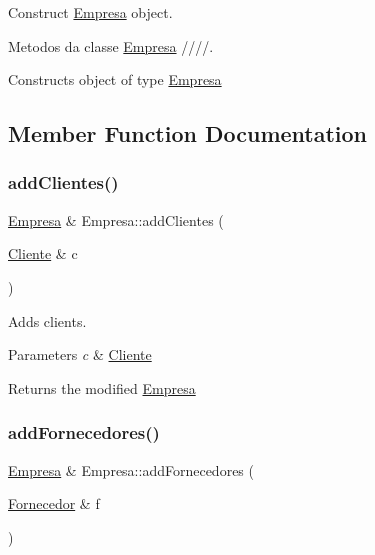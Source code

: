 Construct \hyperlink{classEmpresa}{Empresa} object. 

Metodos da classe \hyperlink{classEmpresa}{Empresa} ////.

Constructs object of type \hyperlink{classEmpresa}{Empresa} 

\subsection{Member Function Documentation}
\mbox{\label{classEmpresa_a57597ec4154f274686bc648ccf5d2a59}} 
\subsubsection{\texorpdfstring{add\+Clientes()}{addClientes()}}
{\footnotesize\ttfamily \hyperlink{classEmpresa}{Empresa} \& Empresa\+::add\+Clientes (\begin{DoxyParamCaption}\item[{\hyperlink{classCliente}{Cliente} \&}]{c }\end{DoxyParamCaption})}



Adds clients. 


\begin{DoxyParams}{Parameters}
{\em c} & \hyperlink{classCliente}{Cliente}\\
\hline
\end{DoxyParams}
\begin{DoxyReturn}{Returns}
the modified \hyperlink{classEmpresa}{Empresa} 
\end{DoxyReturn}
\mbox{\label{classEmpresa_a0c858479d6e92094adbb2fc085039376}} 
\subsubsection{\texorpdfstring{add\+Fornecedores()}{addFornecedores()}}
{\footnotesize\ttfamily \hyperlink{classEmpresa}{Empresa} \& Empresa\+::add\+Fornecedores (\begin{DoxyParamCaption}\item[{\hyperlink{classFornecedor}{Fornecedor} \&}]{f }\end{DoxyParamCaption})}



